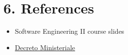 \chapter{6. References}

\begin{itemize}
\item
  Software Engineering II course slides
\item
  \href{https://www.gazzettaufficiale.it/atto/vediPermalink?atto.dataPubblicazioneGazzetta=2020-11-09\&atto.codiceRedazionale=20G00170\&tipoSerie=serie_generale\&tipoVigenza=originario\&tipoProvvedimento=*}{Decreto Ministeriale}
\end{itemize}


